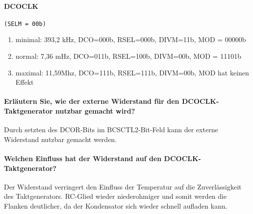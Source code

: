 \paragraph{DCOCLK} \texttt{(SELM = 00b)}
\begin{enumerate}
    \item minimal: 393,2 kHz, DCO=000b, RSEL=000b, DIVM=11b, MOD = 00000b
    \item normal: 7,36 mHz, DCO=011b, RSEL=100b, DIVM=00b, MOD = 11101b
    \item maximal: 11,59Mhz, DCO=111b, RSEL=111b, DIVM=00b, MOD hat keinen Effekt
\end{enumerate}

\paragraph{Erläutern Sie, wie der externe Widerstand für den DCOCLK-Taktgenerator nutzbar gemacht wird?}
Durch setzten des DCOR-Bits im BCSCTL2-Bit-Feld kann der externe Widerstand nutzbar gemacht werden.

\paragraph{Welchen Einfluss hat der Widerstand auf den DCOCLK-Taktgenerator?}
Der Widerstand verringert den Einfluss der Temperatur auf die Zuverlässigkeit des Taktgenerators. RC-Glied wieder niederohmiger und somit werden die Flanken deutlicher, da der Kondensator sich wieder schnell aufladen kann.

